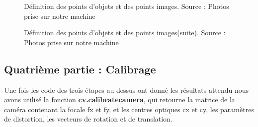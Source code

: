  	 \begin{figure}[H]%
 		\center%
 		\setlength{\fboxsep}{5pt}%
 		\setlength{\fboxrule}{0.5pt}%
 		\caption[Définition des points d'objets et points images]{Définition des points d'objets et des points images. Source : Photos prise sur notre machine}
 		\label{fig:Définition des points d'objets et des points images}
 	\end{figure}
 	
 	\begin{figure}[H]%
 		\center%
 		\setlength{\fboxsep}{5pt}%
 		\setlength{\fboxrule}{0.5pt}%
 		\caption[Définition des points d'objets et points images(suite)]{Définition des points d'objets et des points images(suite). Source : Photos prise sur notre machine}
 		\label{fig:Définition des points d'objets et des points images(suite)}
 	\end{figure}
 	
  
 \subsection{Quatrième partie : Calibrage}
 
 Une fois les code des trois étapes au dessus ont donné les résultats attendu nous avons utilisé la fonction \textbf{cv.calibratecamera}, qui retourne la matrice de la caméra contenant la focale fx et fy, et les centres optiques cx et cy, les paramètres de distortion, les vecteurs de rotation et de translation.
 
